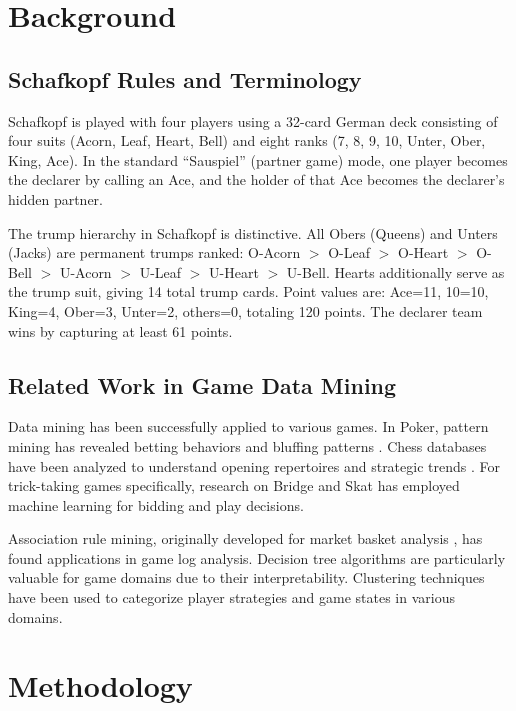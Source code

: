 \documentclass[conference]{IEEEtran}
\begin{document}
\section{Background}

\subsection{Schafkopf Rules and Terminology}

Schafkopf is played with four players using a 32-card German deck consisting of four suits (Acorn, Leaf, Heart, Bell) and eight ranks (7, 8, 9, 10, Unter, Ober, King, Ace). In the standard ``Sauspiel'' (partner game) mode, one player becomes the declarer by calling an Ace, and the holder of that Ace becomes the declarer's hidden partner.

The trump hierarchy in Schafkopf is distinctive. All Obers (Queens) and Unters (Jacks) are permanent trumps ranked: O-Acorn $>$ O-Leaf $>$ O-Heart $>$ O-Bell $>$ U-Acorn $>$ U-Leaf $>$ U-Heart $>$ U-Bell. Hearts additionally serve as the trump suit, giving 14 total trump cards. Point values are: Ace=11, 10=10, King=4, Ober=3, Unter=2, others=0, totaling 120 points. The declarer team wins by capturing at least 61 points.

\subsection{Related Work in Game Data Mining}

Data mining has been successfully applied to various games. In Poker, pattern mining has revealed betting behaviors and bluffing patterns \cite{billings2002challenge}. Chess databases have been analyzed to understand opening repertoires and strategic trends \cite{silver2016mastering}. For trick-taking games specifically, research on Bridge \cite{tian2020joint} and Skat \cite{kupferschmid2006skat} has employed machine learning for bidding and play decisions.

Association rule mining, originally developed for market basket analysis \cite{agrawal1994fast}, has found applications in game log analysis. Decision tree algorithms \cite{quinlan1986induction} are particularly valuable for game domains due to their interpretability. Clustering techniques have been used to categorize player strategies and game states in various domains.

\section{Methodology}
\end{document}
